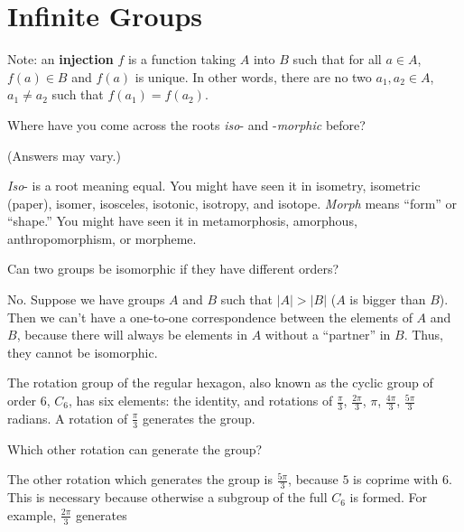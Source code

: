 \documentclass[../key.tex]{subfiles}
\begin{document}
\section{Infinite Groups}

Note: an \textbf{injection} $f$ is a function taking $A$ into $B$ such that for all $a\in A$, $f(a)\in B$ and $f(a)$ is unique. In other words, there are no two $a_1,a_2\in A$, $a_1\neq a_2$ such that $f(a_1)=f(a_2)$.

\begin{outer_problem}[start=1]
\item Where have you come across the roots \textit{iso}- and -\textit{morphic} before?
\end{outer_problem}

\noindent (Answers may vary.)

\textit{Iso}- is a root meaning equal. You might have seen it in isometry, isometric (paper), isomer, isosceles, isotonic, isotropy, and isotope. \textit{Morph} means ``form'' or ``shape.'' You might have seen it in metamorphosis, amorphous, anthropomorphism, or morpheme.

\begin{outer_problem}
\item Can two groups be isomorphic if they have different orders?
\end{outer_problem}

\noindent No. Suppose we have groups $A$ and $B$ such that $|A|>|B|$ ($A$ is bigger than $B$). Then we can't have a one-to-one correspondence between the elements of $A$ and $B$, because there will always be elements in $A$ without a ``partner'' in $B$. Thus, they cannot be isomorphic.

\begin{outer_problem}
\item The rotation group of the regular hexagon, also known as the cyclic group of order $6$, $C_6$, has six elements: the identity, and rotations of $\frac{\pi}{3}$, $\frac{2\pi}{3}$, $\pi$, $\frac{4\pi}{3}$, $\frac{5\pi}{3}$ radians. A rotation of $\frac{\pi}{3}$ generates the group.
\end{outer_problem}

\begin{inner_problem}[start=1]
\item Which other rotation can generate the group?
\end{inner_problem}

\noindent The other rotation which generates the group is $\frac{5\pi}{3}$, because $5$ is coprime with $6$. This is necessary because otherwise a subgroup of the full $C_6$ is formed. For example, $\frac{2\pi}{3}$ generates
\end{document}

